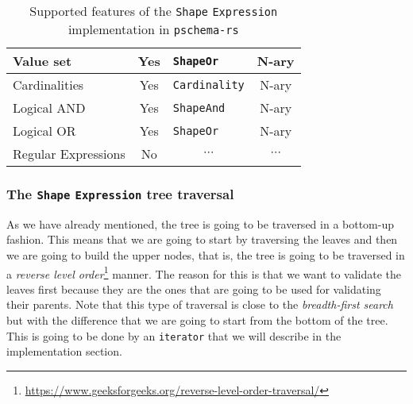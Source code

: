 \begin{table}[ht]
\begin{tabular}{|l|c|l|c|}
        Value set                                                      & {\color[HTML]{009901} Yes} & \texttt{ShapeOr}                                                             & N-ary                                                               \\ \hline
        Cardinalities                                                  & {\color[HTML]{009901} Yes} & \texttt{Cardinality}                                                         & N-ary                                                               \\ \hline
        Logical AND                                                    & {\color[HTML]{009901} Yes} & \texttt{ShapeAnd}                                                            & N-ary                                                               \\ \hline
        Logical OR                                                     & {\color[HTML]{009901} Yes} & \texttt{ShapeOr}                                                             & N-ary                                                               \\ \hline
        Regular Expressions                                            & {\color[HTML]{FE0000} No}  & \multicolumn{1}{c|}{$\cdots$}                                                & \multicolumn{1}{c|}{$\cdots$}                                       \\ \hline
    \end{tabular}
    \caption{Supported features of the \texttt{Shape} \texttt{Expression} implementation in \texttt{pschema-rs}}
    \label{table:shex-features}
\end{table}

\label{section:shape_expression_tree_traversal}
\subsubsection{The \texttt{Shape} \texttt{Expression} tree traversal}

As we have already mentioned, the tree is going to be traversed in a bottom-up fashion. This means that we are going to start by traversing the leaves and then we are going to build the upper nodes, that is, the tree is going to be traversed in a \textit{reverse level order}\footnote{\url{https://www.geeksforgeeks.org/reverse-level-order-traversal/}} manner. The reason for this is that we want to validate the leaves first because they are the ones that are going to be used for validating their parents. Note that this type of traversal is close to the \textit{breadth-first search} but with the difference that we are going to start from the bottom of the tree. This is going to be done by an \texttt{iterator} that we will describe in the implementation section.

